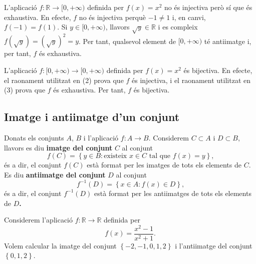 \begin{exemple}
L'aplicació $f:\mathbb{R}\longrightarrow[0,+\infty)$ definida per $%
f(x)=x^{2}$ no és injectiva però sí que és exhaustiva. En
efecte, $f$ no és injectiva perquè $-1\neq1$ i, en canvi, $f(-1)=f(1)
$. Si $y\in[0,+\infty)$, llavors $\sqrt{y}\in\mathbb{R}$ i es compleix
$f\left( \sqrt{y}\right) =\left( \sqrt{y}\right) ^{2}=y$. Per tant,
qualsevol element de $[0,+\infty)$ té antiimatge i, per tant, $f$ és
exhaustiva.
\end{exemple}

\begin{exemple}
L'aplicació $f:[0,+\infty)\longrightarrow[0,+\infty)$ definida per
$f(x)=x^{2}$ és bijectiva. En efecte, el raonament utilitzat en (2)
prova que $f$ és injectiva, i el raonament utilitzat en (3) prova que $f$
és exhaustiva. Per tant, $f$ és bijectiva.
\end{exemple}

\subsection{Imatge i antiimatge d'un conjunt}

Donats els conjunts $A$, $B$ i l'aplicació $f:A\longrightarrow B$.
Considerem $C\subset A$ i $D\subset B$, llavors es diu \textbf{imatge del
conjunt} $C$ al conjunt%
\begin{equation*}
f(C)=\left\{ y\in B:\text{existeix }x\in C\text{ tal que }f(x)=y\right\}
\text{,}
\end{equation*}
és a dir, el conjunt $f(C)$ està format per les imatges de tots els
elements de $C$. Es diu \textbf{antiimatge del conjunt} $D$ al conjunt%
\begin{equation*}
f^{-1}(D)=\left\{ x\in A:f(x)\in D\right\} \text{,}
\end{equation*}
és a dir, el conjunt $f^{-1}(D)$ està format per les antiimatges de
tots els elements de $D$\textbf{. }

\begin{exemple}
Considerem l'aplicació $f:\mathbb{R}\longrightarrow\mathbb{R}$ definida
per%
\begin{equation*}
f(x)=\frac{x^{2}-1}{x^{2}+1}\text{.}
\end{equation*}
Volem calcular la imatge del conjunt $\left\{ -2,-1,0,1,2\right\} $ i
l'antiimatge del conjunt $\left\{ 0,1,2\right\} $.
\end{exemple}

